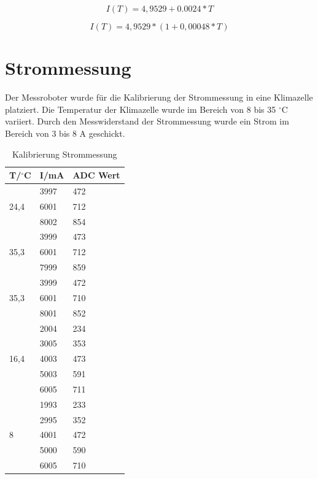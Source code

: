 \documentclass[a4paper,bibtotoc,oneside]{scrbook}
\begin{document}
  \begin{equation}
     I(T) = 4,9529+0.0024 \ast T
  \end{equation}
  
    \begin{equation}
     I(T) = 4,9529 \ast ( 1 + 0,00048 \ast T)
  \end{equation}

\section{Strommessung}\thispagestyle{empty}

Der Messroboter wurde für die Kalibrierung der Strommessung in eine Klimazelle platziert.  Die Temperatur der Klimazelle wurde im Bereich von 8 bis 35 $^{\circ}$C variiert. Durch den Messwiderstand der Strommessung wurde ein Strom im Bereich von 3 bis 8 A geschickt.  

\begin{table}[htbp]
\centering
\begin{tabular}{|l|l|l|}
\hline
T/$^{\circ}$C & I/mA & ADC Wert \\ 
\hline
\hline

\multirow{3}{*}{24,4} & 3997 & 472 \\
 & 6001 & 712 \\
 & 8002 & 854 \\ \hline
\multirow{3}{*}{35,3} & 3999 & 473 \\
 & 6001 & 712 \\
 & 7999 & 859 \\ \hline
\multirow{3}{*}{35,3} & 3999 & 472 \\
 & 6001 & 710 \\
 & 8001 & 852 \\ \hline
\multirow{5}{*}{16,4} & 2004 & 234 \\
 & 3005 & 353 \\
 & 4003 & 473 \\
 & 5003 & 591 \\
 & 6005 & 711 \\ \hline
\multirow{5}{*}{8} & 1993 & 233 \\
 & 2995 & 352 \\
 & 4001 & 472 \\
 & 5000 & 590 \\
 & 6005 & 710 \\ \hline
\end{tabular}
\caption{Kalibrierung Strommessung}\label{TabS}
\end{table}
\end{document}
